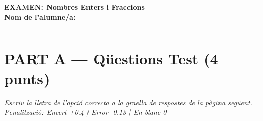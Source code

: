 \documentclass[a4paper, 11pt]{article}
\newcommand{\setsectioncolor}[1]{
  \color{#1}
}
\begin{document}

\vspace*{1.5cm}

\begin{center}
    {\huge \setsectioncolor{BrightPurple} \textbf{EXAMEN: Nombres Enters i Fraccions}} \\
    \vspace{0.5cm}
    \textbf{Nom de l'alumne/a:} \rule{10cm}{0.4pt}
\end{center}

\vspace{1cm}

\section*{\setsectioncolor{BrightPurple} PART A — Qüestions Test (4 punts)}
\textit{Escriu la lletra de l'opció correcta a la graella de respostes de la pàgina següent.} \\
\textit{Penalització: Encert +0.4 | Error -0.13 | En blanc 0}
\end{document}
